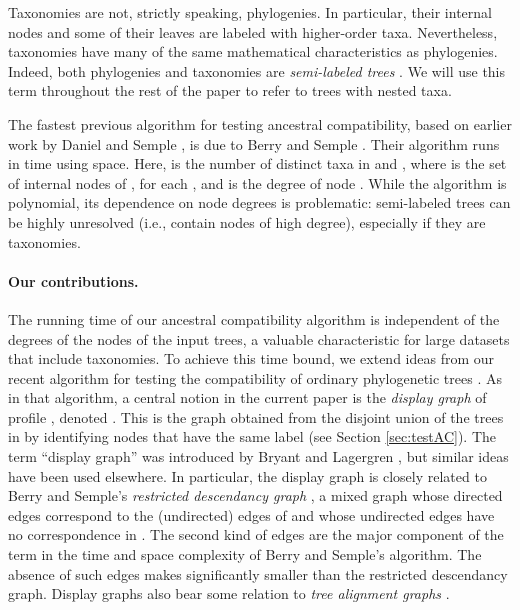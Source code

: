 \documentclass[11pt]{article}
\theoremstyle{definition}
\begin{document}
Taxonomies are not, strictly speaking, phylogenies.  In particular, their internal nodes and some of their leaves are labeled with higher-order taxa. Nevertheless, taxonomies have many of the same mathematical characteristics as phylogenies.  Indeed, both phylogenies and taxonomies are \emph{semi-labeled trees} \cite{BordewichEvansSemple2006,SempleSteel03}.  We will use this term throughout the rest of the paper to refer to trees with nested taxa.



The fastest previous algorithm for testing ancestral compatibility, based on earlier work by Daniel and Semple \cite{DanielSemple2004}, is due to Berry and Semple \cite{BerrySemple2006}. Their algorithm runs in  time using  space. Here,  is the number of distinct taxa in  and  , where  is the set of internal nodes of , for each , and  is the degree of node .   While the algorithm is polynomial, its dependence on node degrees is problematic:  semi-labeled trees can be highly unresolved (i.e., contain nodes of high degree), especially if they are taxonomies.

\vspace{-1.5\parsep}

\paragraph{Our contributions.}
The  running time of our ancestral compatibility algorithm is independent of the degrees of the nodes of the input trees, a valuable characteristic for large datasets that include taxonomies.  To achieve this time bound, we extend ideas from our recent algorithm for testing the compatibility of ordinary phylogenetic trees \cite{DengFB2016}.   As in that algorithm, a central notion in the current paper is the \emph{display graph} of profile , denoted .  This is the graph obtained from the disjoint union of the trees in  by identifying nodes that have the same label (see Section \ref{sec:testAC}).
The term ``display graph'' was introduced by Bryant and Lagergren  \cite{BryantLagergren06}, but similar ideas have been used elsewhere.  In particular, the display graph is closely related to Berry and Semple's \emph{restricted descendancy graph} \cite{BerrySemple2006}, a mixed graph whose directed edges correspond to the (undirected) edges of  and whose undirected edges have no correspondence in .  The second kind of edges are the major component of the  term in the time and space complexity of Berry and Semple's algorithm.  The absence of such edges makes  significantly smaller than the restricted descendancy graph.  Display graphs also bear some relation to  \emph{tree alignment graphs} \cite{Smith:PloSCB:2013}.
\end{document}
